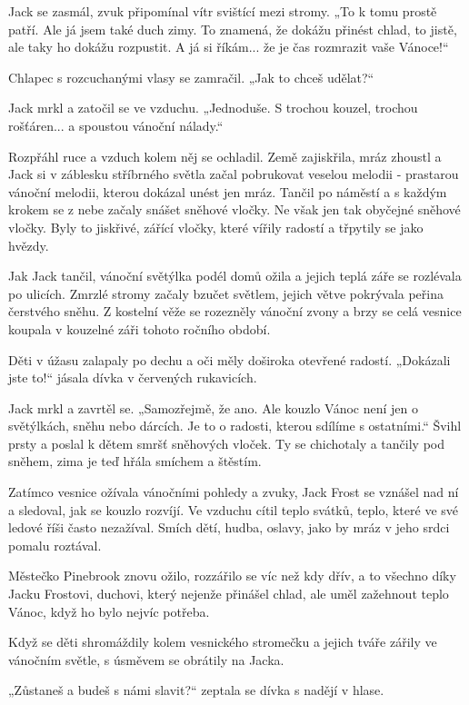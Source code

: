 \documentclass{article}
\begin{document}
Jack se zasmál, zvuk připomínal vítr svištící mezi stromy. „To k tomu prostě patří. Ale já jsem také duch zimy. To znamená, že dokážu přinést chlad, to jistě, ale taky ho dokážu rozpustit. A já si říkám... že je čas rozmrazit vaše Vánoce!“

Chlapec s rozcuchanými vlasy se zamračil. „Jak to chceš udělat?“

Jack mrkl a zatočil se ve vzduchu. „Jednoduše. S trochou kouzel, trochou rošťáren... a spoustou vánoční nálady.“

Rozpřáhl ruce a vzduch kolem něj se ochladil. Země zajiskřila, mráz zhoustl a Jack si v záblesku stříbrného světla začal pobrukovat veselou melodii - prastarou vánoční melodii, kterou dokázal unést jen mráz. Tančil po náměstí a s každým krokem se z nebe začaly snášet sněhové vločky. Ne však jen tak obyčejné sněhové vločky. Byly to jiskřivé, zářící vločky, které vířily radostí a třpytily se jako hvězdy.

Jak Jack tančil, vánoční světýlka podél domů ožila a jejich teplá záře se rozlévala po ulicích. Zmrzlé stromy začaly bzučet světlem, jejich větve pokrývala peřina čerstvého sněhu. Z kostelní věže se rozezněly vánoční zvony a brzy se celá vesnice koupala v kouzelné záři tohoto ročního období.

Děti v úžasu zalapaly po dechu a oči měly doširoka otevřené radostí. „Dokázali jste to!“ jásala dívka v červených rukavicích.

Jack mrkl a zavrtěl se. „Samozřejmě, že ano. Ale kouzlo Vánoc není jen o světýlkách, sněhu nebo dárcích. Je to o radosti, kterou sdílíme s ostatními.“ Švihl prsty a poslal k dětem smršť sněhových vloček. Ty se chichotaly a tančily pod sněhem, zima je teď hřála smíchem a štěstím.

Zatímco vesnice ožívala vánočními pohledy a zvuky, Jack Frost se vznášel nad ní a sledoval, jak se kouzlo rozvíjí. Ve vzduchu cítil teplo svátků, teplo, které ve své ledové říši často nezažíval. Smích dětí, hudba, oslavy, jako by mráz v jeho srdci pomalu roztával.

Městečko Pinebrook znovu ožilo, rozzářilo se víc než kdy dřív, a to všechno díky Jacku Frostovi, duchovi, který nejenže přinášel chlad, ale uměl zažehnout teplo Vánoc, když ho bylo nejvíc potřeba.

Když se děti shromáždily kolem vesnického stromečku a jejich tváře zářily ve vánočním světle, s úsměvem se obrátily na Jacka.

„Zůstaneš a budeš s námi slavit?“ zeptala se dívka s nadějí v hlase.
\end{document}
